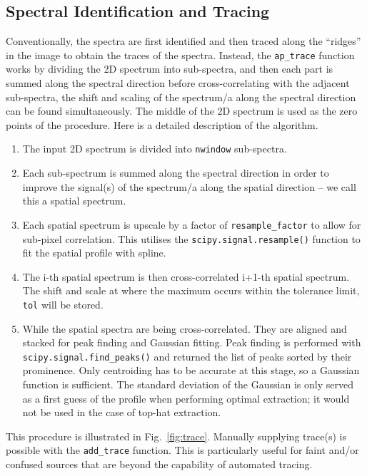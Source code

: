 \documentclass[fleqn,usenatbib]{mnras}
\begin{document}
\subsection{Spectral Identification and Tracing}
\label{sec:tracing}
Conventionally, the spectra are first identified and then traced along
the ``ridges'' in the image to obtain the traces of the spectra.
Instead, the \texttt{ap\_trace} function works by dividing the 2D
spectrum into sub-spectra, and then each part is summed along the
spectral direction before cross-correlating with the adjacent
sub-spectra, the shift and scaling of the spectrum/a along the
spectral direction can be found simultaneously. The middle of the
2D spectrum is used as the zero points of the procedure. Here is a
detailed description of the algorithm.
\begin{enumerate}
    \item
        The input 2D spectrum is divided into \texttt{nwindow}
        sub-spectra.
    \item
        Each sub-spectrum is summed along the spectral direction
        in order to improve the signal(s) of the spectrum/a along
        the spatial direction – we call this a spatial spectrum.
    \item
        Each spatial spectrum is upscale by a factor of
        \texttt{resample\_factor} to allow for sub-pixel correlation.
        This utilises the \texttt{scipy.signal.resample()} function
        to fit the spatial profile with spline.
    \item
        The i-th spatial spectrum is then cross-correlated i+1-th
        spatial spectrum. The shift and scale at where the maximum
        occurs within the tolerance limit, \texttt{tol} will be stored.
    \item
        While the spatial spectra are being cross-correlated. They
        are aligned and stacked for peak finding and Gaussian fitting.
        Peak finding is performed with
        \texttt{scipy.signal.find\_peaks()} and returned the list of
        peaks sorted by their prominence. Only centroiding has to be
        accurate at this stage, so a Gaussian function is sufficient.
        The standard deviation of the Gaussian is only served as a
        first guess of the profile when performing optimal extraction;
        it would not be used in the case of top-hat extraction.
\end{enumerate}

This procedure is illustrated in Fig.~\ref{fig:trace}. Manually
supplying trace(s) is possible with the \texttt{add\_trace}
function. This is particularly useful for faint and/or confused
sources that are beyond the capability of automated tracing.
\end{document}
